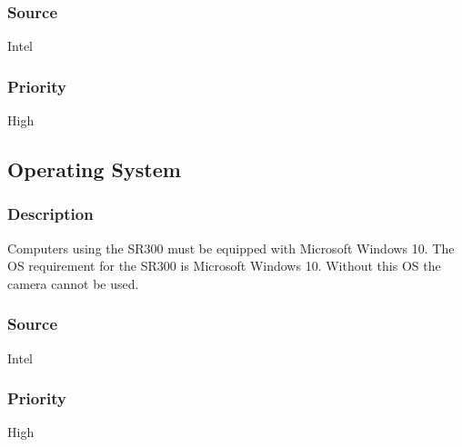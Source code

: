 \subsubsection{Source}
Intel
\subsubsection{Priority}
High
\subsection{Operating System}
\subsubsection{Description}
Computers using the SR300 must be equipped with Microsoft Windows 10. The OS requirement for the SR300 is Microsoft Windows 10.  Without this OS the camera cannot be used.
\subsubsection{Source}
Intel
\subsubsection{Priority}
High